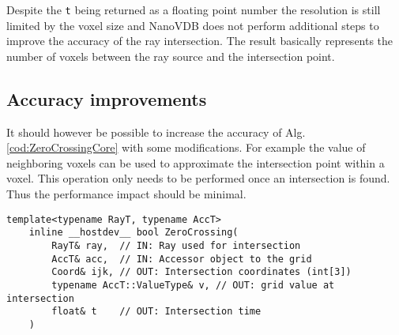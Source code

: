 Despite the \texttt{t} being returned as a floating point number the resolution is still limited by the voxel size and NanoVDB does not perform additional steps to improve the accuracy of the ray intersection.
The result basically represents the number of voxels between the ray source and the intersection point.

\subsection{Accuracy improvements}

It should however be possible to increase the accuracy of Alg. \ref{cod:ZeroCrossingCore} with some modifications.
For example the value of neighboring voxels can be used to approximate the intersection point within a voxel.
This operation only needs to be performed once an intersection is found. Thus the performance impact should be minimal.

\begin{lstlisting}[caption={Footprint of NanoVDB's raytracing function. Types for coordinates (ijk) and time (t) are hardcoded. The function returns false if no intersection has been detected}]
    template<typename RayT, typename AccT>
    inline __hostdev__ bool ZeroCrossing(
        RayT& ray,  // IN: Ray used for intersection
        AccT& acc,  // IN: Accessor object to the grid
        Coord& ijk, // OUT: Intersection coordinates (int[3])
        typename AccT::ValueType& v, // OUT: grid value at intersection
        float& t    // OUT: Intersection time
    )
    \end{lstlisting}
\label{cod:ZeroCrossing}








